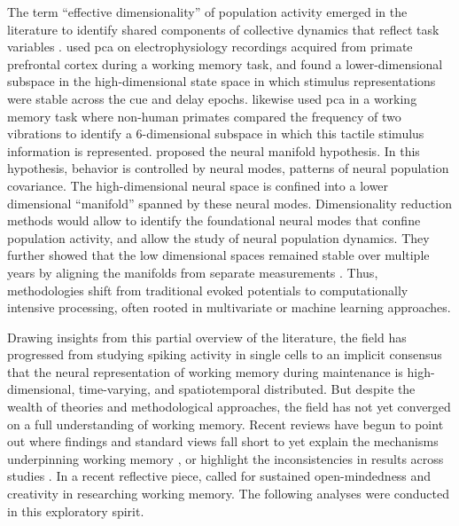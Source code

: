 The term ``effective dimensionality'' of population activity emerged in the literature to identify shared components of collective dynamics that reflect task variables \citep{jazayeri2021interpreting}.
\citet{murray2017stable} used \gls{pca} on electrophysiology recordings acquired from primate prefrontal cortex during a working memory task, and found a lower-dimensional subspace in the high-dimensional state space in which stimulus representations were stable across the cue and delay epochs.
\citet{machens2010functional} likewise used \gls{pca} in a working memory task where non-human primates compared the frequency of two vibrations to identify a 6-dimensional subspace in which this tactile stimulus information is represented.
\citet{gallego2017neural} proposed the neural manifold hypothesis.
In this hypothesis, behavior is controlled by neural modes, patterns of neural population covariance.
The high-dimensional neural space is confined into a lower dimensional ``manifold'' spanned by these neural modes.
Dimensionality reduction methods would allow to identify the foundational neural modes that confine population activity, and allow the study of neural population dynamics.
They further showed that the low dimensional spaces remained stable over multiple years by aligning the manifolds from separate measurements \citep{gallego2020long}.
Thus, methodologies shift from traditional evoked potentials to computationally intensive processing, often rooted in multivariate or machine learning approaches.


Drawing insights from this partial overview of the literature, the field has progressed from studying spiking activity in single cells to an implicit consensus that the neural representation of working memory during maintenance is high-dimensional, time-varying, and spatiotemporal distributed.
But despite the wealth of theories and methodological approaches, the field has not yet converged on a full understanding of working memory.
Recent reviews have begun to point out where findings and standard views fall short to yet explain the mechanisms underpinning working memory \citep{nobre2022opening}, or highlight the inconsistencies in results across studies \citep{pavlov2022oscillatory}.
In a recent reflective piece, \citet{nobre2022opening} called for sustained open-mindedness and creativity in researching working memory.
The following analyses were conducted in this exploratory spirit.





